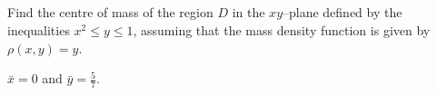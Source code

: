 \subsection*{\Procedural}

\begin{question}[M200 2005D] %
Find the centre of mass of the region $D$ in the $xy$--plane 
defined by the inequalities $x^2 \le y \le 1$, assuming that 
the mass density function is given by $\rho(x,y) = y$.
\end{question}

%

\begin{answer}
$\bar x=0$ and $\bar y =  \frac{5}{7}$.
\end{answer}

